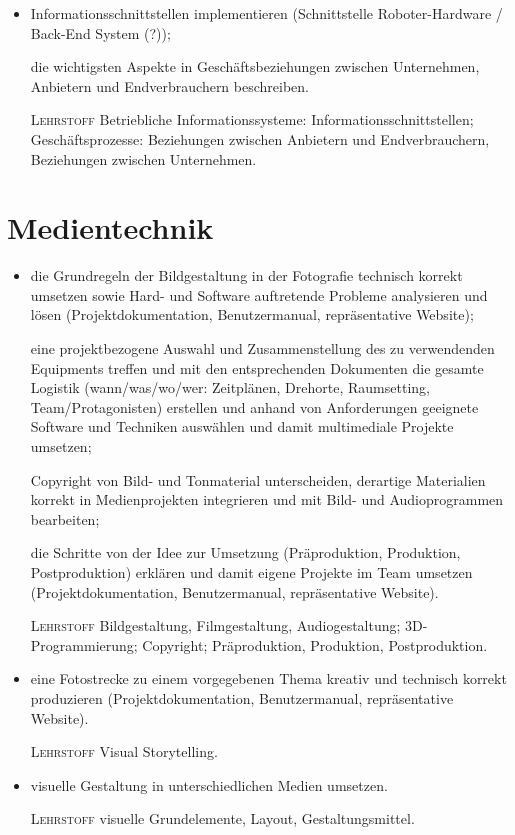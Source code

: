 \begin{itemize}[label={-}]
    \item Informationsschnittstellen implementieren
        {\color{red}(Schnittstelle Roboter-Hardware / Back-End System (?))};
    \item[] die wichtigsten Aspekte in Geschäftsbeziehungen zwischen Unternehmen, Anbietern und Endverbrauchern beschreiben.
    \item[\tiny\textsc{Lehrstoff}] Betriebliche Informationssysteme: Informationsschnittstellen; Geschäftsprozesse: Beziehungen zwischen Anbietern und Endverbrauchern, Beziehungen zwischen Unternehmen.
\end{itemize} 


\section{Medientechnik}

\begin{itemize}[label={-}]
    \item die Grundregeln der Bildgestaltung in der Fotografie technisch korrekt umsetzen sowie Hard- und Software auftretende Probleme analysieren und lösen
        {\color{red}(Projektdokumentation, Benutzermanual, repräsentative Website)};
    \item[] eine projektbezogene Auswahl und Zusammenstellung des zu verwendenden Equipments treffen und mit den entsprechenden Dokumenten die gesamte Logistik (wann/was/wo/wer: Zeitplänen, Drehorte, Raumsetting, Team/Protagonisten) erstellen und anhand von Anforderungen geeignete Software und Techniken auswählen und damit multimediale Projekte umsetzen;
    \item[] Copyright von Bild- und Tonmaterial unterscheiden, derartige Materialien korrekt in Medienprojekten integrieren und mit Bild- und Audioprogrammen bearbeiten;
    \item[] die Schritte von der Idee zur Umsetzung (Präproduktion, Produktion, Postproduktion) erklären und damit eigene Projekte im Team umsetzen
        {\color{red}(Projektdokumentation, Benutzermanual, repräsentative Website)}.
    \item[\tiny\textsc{Lehrstoff}] Bildgestaltung, Filmgestaltung, Audiogestaltung; 3D-Programmierung; Copyright; Präproduktion, Produktion, Postproduktion.\lehrstoffrule
 
    \item eine Fotostrecke zu einem vorgegebenen Thema kreativ und technisch korrekt produzieren
        {\color{red}(Projektdokumentation, Benutzermanual, repräsentative Website)}.
    \item[\tiny\textsc{Lehrstoff}] Visual Storytelling.\lehrstoffrule
 
    \item visuelle Gestaltung in unterschiedlichen Medien umsetzen.
    \item[\tiny\textsc{Lehrstoff}] visuelle Grundelemente, Layout, Gestaltungsmittel.
\end{itemize}

